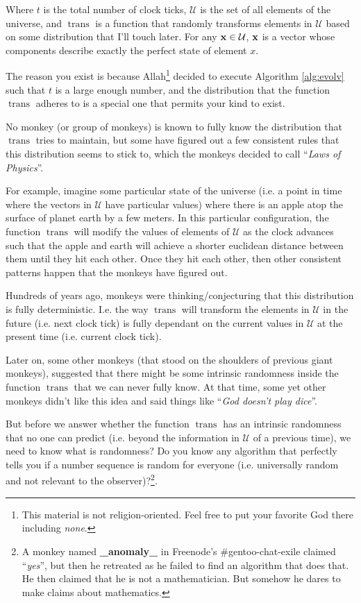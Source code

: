 \documentclass{report}
\DeclareMathOperator{\trans}{trans}
\begin{document}
Where $t$ is the total number of clock ticks, $\mathcal{U}$ is the set of all elements of
the universe, and $\trans$ is a function that randomly transforms elements
in $\mathcal{U}$ based on some distribution that I'll touch later. For any $\bf{x} \in
\mathcal{U}$, $\bf{x}$ is a vector whose components describe exactly the perfect state of
element $x$.

The reason you exist is because Allah\footnote{This material is not
religion-oriented. Feel free to put your favorite God there including
\emph{none}.} decided to execute Algorithm \ref{alg:evolv} such that $t$ is a
large enough number, and the distribution that the function $\trans$
adheres to is a special one that permits your kind to exist.

No monkey (or group of monkeys) is known to fully know the distribution that
$\trans$ tries to maintain, but some have figured out a few consistent
rules that this distribution seems to stick to, which the monkeys decided to
call ``\emph{Laws of Physics}''.

For example, imagine some particular state of the universe (i.e. a point in
time where the vectors in $\mathcal{U}$ have particular values) where there is an apple
atop the surface of planet earth by a few meters. In this particular
configuration, the function $\trans$ will modify the values of elements of
$\mathcal{U}$ as the clock advances such that the apple and earth will achieve a shorter
euclidean distance between them until they hit each other. Once they hit each
other, then other consistent patterns happen that the monkeys have figured out.

Hundreds of years ago, monkeys were thinking/conjecturing that
this distribution is fully deterministic. I.e. the way $\trans$ will
transform the elements in $\mathcal{U}$ in the future (i.e. next clock tick) is fully
dependant on the current values in $\mathcal{U}$ at the present time (i.e. current clock
tick).

Later on, some other monkeys (that stood on the shoulders of previous giant
monkeys), suggested that there might be some intrinsic randomness inside the
function $\trans$ that we can never fully know. At that time, some yet
other monkeys didn't like this idea and said things like ``\emph{God doesn't
play dice}''.

But before we answer whether the function $\trans$ has an intrinsic
randomness that no one can predict (i.e. beyond the information in $\mathcal{U}$ of a
previous time), we need to know what is randomness? Do you know any algorithm
that perfectly tells you if a number sequence is random for everyone (i.e.
universally random and not relevant to the observer)?\footnote{A monkey named
\textbf{\_anomaly\_} in Freenode's \#gentoo-chat-exile claimed ``\emph{yes}'',
but then he retreated as he failed to find an algorithm that does that. He then
claimed that he is not a mathematician. But somehow he dares to make claims
about mathematics.}.
\end{document}
